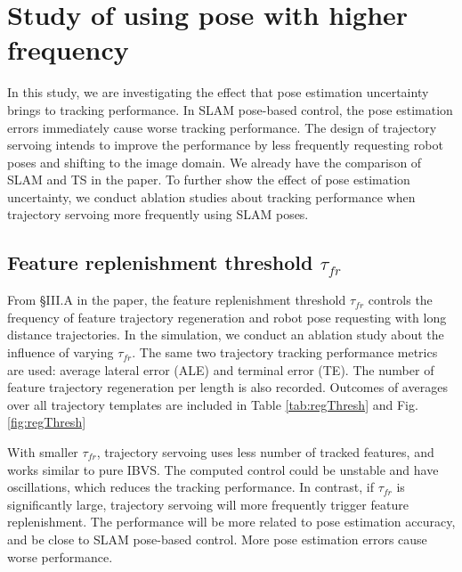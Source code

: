 \section{Study of using pose with higher frequency}

In this study, we are investigating the effect that pose estimation 
uncertainty brings to tracking performance. 
In SLAM pose-based control, the pose estimation errors immediately cause worse tracking performance. 
The design of trajectory servoing intends to improve the performance 
by less frequently requesting robot poses and shifting to the image domain. 
We already have the comparison of SLAM and TS in the paper. 
To further show the effect of pose estimation uncertainty, 
we conduct ablation studies about tracking performance 
when trajectory servoing more frequently using SLAM poses.

\subsection{Feature replenishment threshold $\tau_{fr}$ \label{sec:thresh}}

From \S III.A in the paper, the feature replenishment threshold $\tau_{fr}$ 
controls the frequency of feature trajectory regeneration and 
robot pose requesting with long distance trajectories.
In the simulation, we conduct an ablation study about the influence of 
varying $\tau_{fr}$. 
The same two trajectory tracking performance metrics are used: 
average lateral error (ALE) and terminal error (TE).
The number of feature trajectory regeneration per length is also recorded.
Outcomes of averages over all trajectory templates are included in 
Table \ref{tab:regThresh} and Fig. \ref{fig:regThresh}

With smaller $\tau_{fr}$, trajectory servoing uses less number of tracked features, 
and works similar to pure IBVS. 
The computed control could be unstable and have oscillations, which reduces 
the tracking performance. 
In contrast, if $\tau_{fr}$ is significantly large, trajectory servoing 
will more frequently trigger feature replenishment. 
The performance will be more related to pose estimation accuracy, 
and be close to SLAM pose-based control.
More pose estimation errors cause worse performance.


